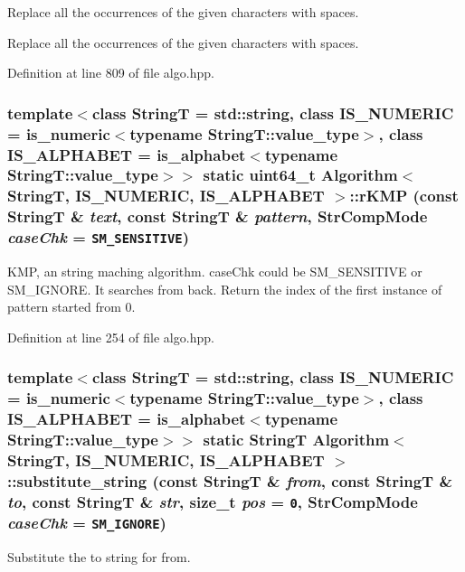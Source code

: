Replace all the occurrences of the given characters with spaces. 

Replace all the occurrences of the given characters with spaces. 

Definition at line 809 of file algo.hpp.\hypertarget{classAlgorithm_a3e24e19980c0dd29c80f9feff6e5191}{
\subsubsection[{rKMP}]{\setlength{\rightskip}{0pt plus 5cm}template$<$class StringT  = std::string, class IS\_\-NUMERIC  = is\_\-numeric$<$typename StringT::value\_\-type$>$, class IS\_\-ALPHABET  = is\_\-alphabet$<$typename StringT::value\_\-type$>$$>$ static uint64\_\-t {\bf Algorithm}$<$ StringT, IS\_\-NUMERIC, IS\_\-ALPHABET $>$::rKMP (const StringT \& {\em text}, \/  const StringT \& {\em pattern}, \/  StrCompMode {\em caseChk} = {\tt SM\_\-SENSITIVE})}}
\label{classAlgorithm_a3e24e19980c0dd29c80f9feff6e5191}


KMP, an string maching algorithm. caseChk could be SM\_\-SENSITIVE or SM\_\-IGNORE. It searches from back. Return the index of the first instance of pattern started from 0. 

Definition at line 254 of file algo.hpp.\hypertarget{classAlgorithm_658530c0e10cee77d1c94801efc28b1d}{
\subsubsection[{substitute\_\-string}]{\setlength{\rightskip}{0pt plus 5cm}template$<$class StringT  = std::string, class IS\_\-NUMERIC  = is\_\-numeric$<$typename StringT::value\_\-type$>$, class IS\_\-ALPHABET  = is\_\-alphabet$<$typename StringT::value\_\-type$>$$>$ static StringT {\bf Algorithm}$<$ StringT, IS\_\-NUMERIC, IS\_\-ALPHABET $>$::substitute\_\-string (const StringT \& {\em from}, \/  const StringT \& {\em to}, \/  const StringT \& {\em str}, \/  size\_\-t {\em pos} = {\tt 0}, \/  StrCompMode {\em caseChk} = {\tt SM\_\-IGNORE})}}
\label{classAlgorithm_658530c0e10cee77d1c94801efc28b1d}


Substitute the to string for from. 

